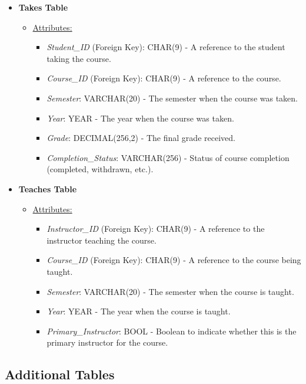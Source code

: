 \documentclass[12pt]{article}
\begin{document}
\begin{itemize}
    \item \textbf{Takes Table}
    \begin{itemize}
        \item \underline{Attributes:}
        \begin{itemize}
            \item \textit{Student\_ID} (Foreign Key): CHAR(9) - A reference to the student taking the course.
            \item \textit{Course\_ID} (Foreign Key): CHAR(9) - A reference to the course.
            \item \textit{Semester}: VARCHAR(20) - The semester when the course was taken.
            \item \textit{Year}: YEAR - The year when the course was taken.
            \item \textit{Grade}: DECIMAL(256,2) -  The final grade received.
            \item \textit{Completion\_Status}: VARCHAR(256) - Status of course completion (completed, withdrawn, etc.).
        \end{itemize}
    \end{itemize}
    
    \item \textbf{Teaches Table}
    \begin{itemize}
        \item \underline{Attributes:}
        \begin{itemize}
            \item \textit{Instructor\_ID} (Foreign Key): CHAR(9) - A reference to the instructor teaching the course.
            \item \textit{Course\_ID} (Foreign Key): CHAR(9) - A reference to the course being taught.
            \item \textit{Semester}: VARCHAR(20) - The semester when the course is taught.
            \item \textit{Year}: YEAR - The year when the course is taught.
            \item \textit{Primary\_Instructor}: BOOL - Boolean to indicate whether this is the primary instructor for the course.
        \end{itemize}
    \end{itemize}
\end{itemize}

\subsection*{Additional Tables}
\end{document}
